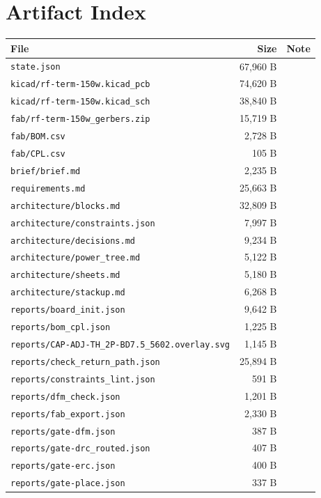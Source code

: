 \documentclass[11pt,a4paper]{article}
\begin{document}
\section{Artifact Index}
{\small
\begin{longtable}{p{9cm}rp{4cm}}
\toprule
\textbf{File} & \textbf{Size} & \textbf{Note} \\
\midrule
\endhead
\texttt{state.json} & 67,960 B &  \\
\texttt{kicad/rf-term-150w.kicad\_pcb} & 74,620 B &  \\
\texttt{kicad/rf-term-150w.kicad\_sch} & 38,840 B &  \\
\texttt{fab/rf-term-150w\_gerbers.zip} & 15,719 B &  \\
\texttt{fab/BOM.csv} & 2,728 B &  \\
\texttt{fab/CPL.csv} & 105 B &  \\
\texttt{brief/brief.md} & 2,235 B &  \\
\texttt{requirements.md} & 25,663 B &  \\
\texttt{architecture/blocks.md} & 32,809 B &  \\
\texttt{architecture/constraints.json} & 7,997 B &  \\
\texttt{architecture/decisions.md} & 9,234 B &  \\
\texttt{architecture/power\_tree.md} & 5,122 B &  \\
\texttt{architecture/sheets.md} & 5,180 B &  \\
\texttt{architecture/stackup.md} & 6,268 B &  \\
\texttt{reports/board\_init.json} & 9,642 B &  \\
\texttt{reports/bom\_cpl.json} & 1,225 B &  \\
\texttt{reports/CAP-ADJ-TH\_2P-BD7.5\_5602.overlay.svg} & 1,145 B &  \\
\texttt{reports/check\_return\_path.json} & 25,894 B &  \\
\texttt{reports/constraints\_lint.json} & 591 B &  \\
\texttt{reports/dfm\_check.json} & 1,201 B &  \\
\texttt{reports/fab\_export.json} & 2,330 B &  \\
\texttt{reports/gate-dfm.json} & 387 B &  \\
\texttt{reports/gate-drc\_routed.json} & 407 B &  \\
\texttt{reports/gate-erc.json} & 400 B &  \\
\texttt{reports/gate-place.json} & 337 B &  \\

\end{longtable}}
\end{document}
